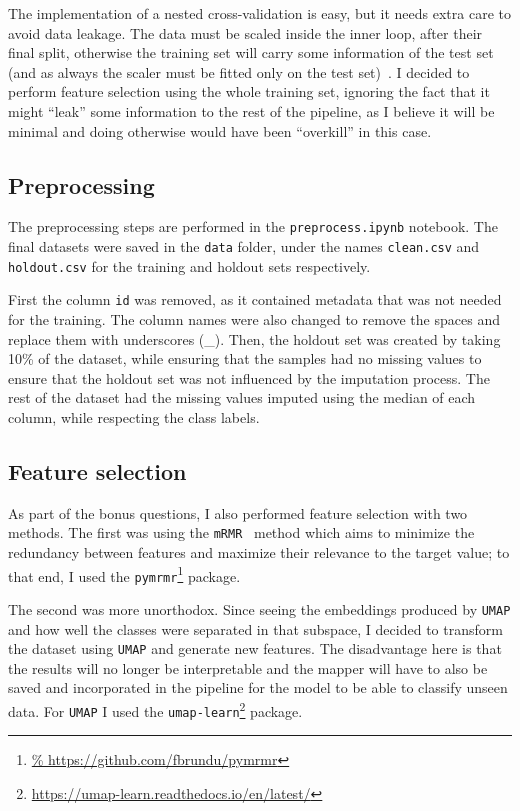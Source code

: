 \documentclass[12pt]{article}
\begin{document}
The implementation of a nested cross-validation is easy, but it needs extra
care to avoid data leakage. The data must be scaled inside the inner loop, after
their final split, otherwise the training set will carry some information of the
test set (and as always the scaler must be fitted only on the test
set)~\cite{Bates_2023}. I decided to perform feature selection using the whole
training set, ignoring the fact that it might ``leak'' some information to the
rest of the pipeline, as I believe it will be minimal and doing otherwise would
have been ``overkill'' in this case.


\subsection{Preprocessing}
The preprocessing steps are performed in the \texttt{preprocess.ipynb} notebook.
The final datasets were saved in the \texttt{data} folder, under the names
\texttt{clean.csv} and \texttt{holdout.csv} for the training and holdout sets
respectively.

First the column \texttt{id} was removed, as it contained metadata that was not
needed for the training. The column names were also changed to remove the spaces
and replace them with underscores (\_). Then, the holdout set was created by
taking 10\% of the dataset, while ensuring that the samples had no missing
values to ensure that the holdout set was not influenced by the imputation
process. The rest of the dataset had the missing values imputed using the median
of each column, while respecting the class labels.


\subsection{Feature selection}

As part of the bonus questions, I also performed feature selection with two
methods. The first was using the \texttt{mRMR}~\cite{mRMR} method which aims to
minimize the redundancy between features and maximize their relevance to the
target value; to that end, I used the \texttt{pymrmr}\footnote{\url{%
https://github.com/fbrundu/pymrmr}} package.

The second was more unorthodox. Since seeing the embeddings produced by
\texttt{UMAP} and how well the classes were separated in that subspace, I
decided to transform the dataset using \texttt{UMAP} and generate new features.
The disadvantage here is that the results will no longer be interpretable and
the mapper will have to also be saved and incorporated in the pipeline for
the model to be able to classify unseen data. For \texttt{UMAP} I used the
\texttt{umap-learn}\footnote{\url{https://umap-learn.readthedocs.io/en/latest/}}
package.
\end{document}
